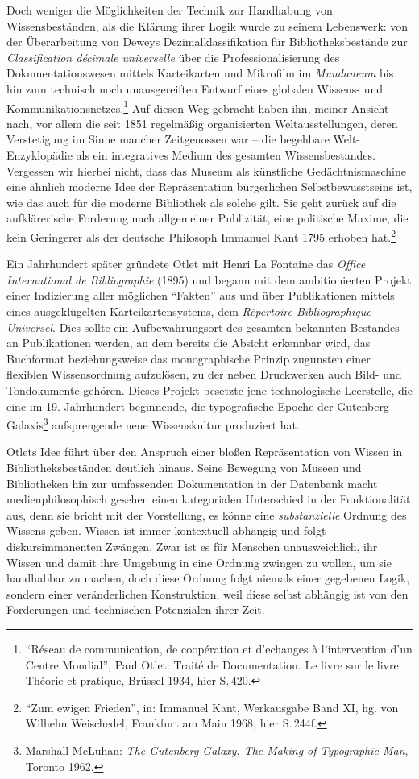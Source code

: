 Doch weniger die Möglichkeiten der Technik zur Handhabung von
Wissensbeständen, als die Klärung ihrer Logik wurde zu seinem
Lebenswerk: von der Überarbeitung von Deweys Dezimalklassifikation für
Bibliotheksbestände zur \emph{Classification décimale universelle} über
die Professionalisierung des Dokumentationswesen mittels Karteikarten
und Mikrofilm im \emph{Mundaneum} bis hin zum technisch noch
unausgereiften Entwurf eines globalen Wissens- und
Kommunikationsnetzes.\footnote{\enquote{Réseau de communication, de
  coopération et d'echanges à l'intervention d'un Centre Mondial}, Paul
  Otlet: Traité de Documentation. Le livre sur le livre. Théorie et
  pratique, Brüssel 1934, hier S.\,420.} Auf diesen Weg gebracht haben
ihn, meiner Ansicht nach, vor allem die seit 1851 regelmäßig
organisierten Weltausstellungen, deren Verstetigung im Sinne mancher
Zeitgenossen war -- die begehbare Welt-Enzyklopädie als ein integratives
Medium des gesamten Wissensbestandes. Vergessen wir hierbei nicht, dass
das Museum als künstliche Gedächtnismaschine eine ähnlich moderne Idee
der Repräsentation bürgerlichen Selbstbewusstseins ist, wie das auch für
die moderne Bibliothek als solche gilt. Sie geht zurück auf die
aufklärerische Forderung nach allgemeiner Publizität, eine politische
Maxime, die kein Geringerer als der deutsche Philosoph Immanuel Kant
1795 erhoben hat.\footnote{\enquote{Zum ewigen Frieden}, in: Immanuel
  Kant, Werkausgabe Band XI, hg. von Wilhelm Weischedel, Frankfurt am
  Main 1968, hier S.\,244f.}

Ein Jahrhundert später gründete Otlet mit Henri La Fontaine das
\emph{Office International de Bibliographie} (1895) und begann mit dem
ambitionierten Projekt einer Indizierung aller möglichen
\enquote{Fakten} aus und über Publikationen mittels eines ausgeklügelten
Karteikartensystems, dem \emph{Répertoire Bibliographique Universel}.
Dies sollte ein Aufbewahrungsort des gesamten bekannten Bestandes an
Publikationen werden, an dem bereits die Absicht erkennbar wird, das
Buchformat beziehungsweise das monographische Prinzip zugunsten einer
flexiblen Wissensordnung aufzulösen, zu der neben Druckwerken auch Bild-
und Tondokumente gehören. Dieses Projekt besetzte jene technologische
Leerstelle, die eine im 19. Jahrhundert beginnende, die typografische
Epoche der Gutenberg-Galaxis\footnote{Marshall McLuhan: \emph{The
  Gutenberg Galaxy. The Making of Typographic Man}, Toronto 1962.}
aufsprengende neue Wissenskultur produziert hat.

Otlets Idee führt über den Anspruch einer bloßen Repräsentation von
Wissen in Bibliotheksbeständen deutlich hinaus. Seine Bewegung von
Museen und Bibliotheken hin zur umfassenden Dokumentation in der
Datenbank macht medienphilosophisch gesehen einen kategorialen
Unterschied in der Funktionalität aus, denn sie bricht mit der
Vorstellung, es könne eine \emph{substanzielle} Ordnung des Wissens
geben. Wissen ist immer kontextuell abhängig und folgt diskursimmanenten
Zwängen. Zwar ist es für Menschen unausweichlich, ihr Wissen und damit
ihre Umgebung in eine Ordnung zwingen zu wollen, um sie handhabbar zu
machen, doch diese Ordnung folgt niemals einer gegebenen Logik, sondern
einer veränderlichen Konstruktion, weil diese selbst abhängig ist von
den Forderungen und technischen Potenzialen ihrer Zeit.

